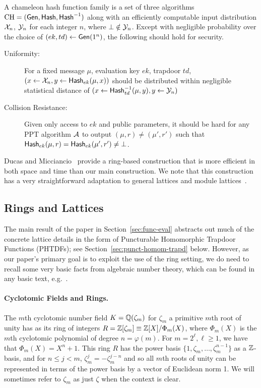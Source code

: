 \begin{definition}A chameleon hash function family is a set of three algorithms
  $\text{CH}=(\mathsf{Gen},\mathsf{Hash},\mathsf{Hash}^{-1})$ along with an efficiently computable
  input distribution $\mathcal{X}_n$, $\mathcal{Y}_n$ for each integer $n$, where
  $\bot \notin \mathcal{Y}_n$. Except with negligible probability over the
  choice of $(ek,td) \gets \mathsf{Gen}(1^n)$, the following should hold for
  security.
\begin{description}
\item[Uniformity:] For a fixed message $\mu$, evaluation key $ek$,
  trapdoor $td$, 
  $(x \gets \mathcal{X}_{n}, y \gets \mathsf{Hash}_{ek}(\mu,x))$ should be
  distributed within negligible statistical distance of $(x \gets
  \mathsf{Hash}^{-1}_{td}(\mu,y), y \gets \mathcal{Y}_{n})$
\item[Collision Resistance:] Given only access to $ek$ and public
  parameters, it should be hard for any PPT algorithm $\mathcal{A}$ to
  output $(\mu,r) \neq (\mu',r')$ such that
  $\mathsf{Hash}_{ek}(\mu,r)=\mathsf{Hash}_{ek}(\mu',r') \neq \bot$. 
\end{description}
\end{definition}


Ducas and
Micciancio~\cite{DBLP:conf/crypto/DucasM14} provide a
ring-based construction that is more efficient in both
space and time than our main construction.
We note that this construction
has a very straightforward adaptation to general lattices and module
lattices~\cite{DBLP:journals/dcc/LangloisS15}.

\subsection{Rings and Lattices}
\label{subsec:gaussians_lattices}

The main result of the paper in Section~\ref{sec:func-eval}
abstracts out much of the concrete lattice details in the form of Puncturable
Homomorphic Trapdoor Functions (PHTDFs); see
Section~\ref{sec:punct-homom-trapd} below. However, as our paper's
primary goal is to exploit the use of the ring setting, we do need to
recall some very basic facts from algebraic number theory, which can be
found in any basic text, e.g.~\cite{milneANT}. 

\paragraph{Cyclotomic Fields and Rings.} The $m$th cyclotomic number
field $K=\mathbb{Q}(\zeta_m)$ for $\zeta_m$ a primitive $m$th root of unity
has as its ring of integers $R=\mathbb{Z}[\zeta_m] \equiv \mathbb{Z}[X]/\Phi_{m}(X)$,
where $\Phi_{m}(X)$ is the $m$th cyclotomic polynomial of degree $n=\varphi(m)$. For
$m=2^{\ell}, \ell\geq 1$, we have that $\Phi_{m}(X) = X^{n}+1$. This
ring $R$ has the power basis $\{1,\zeta_m, \ldots, \zeta_{m}^{n-1}\}$ as a
$\mathbb{Z}$-basis, and for $n \leq j < m$, $\zeta_{m}^j = -\zeta_{m}^{j-n}$
and so all $m$th roots of unity can be represented in terms of the power basis by a vector
of Euclidean norm 1. We will sometimes refer to $\zeta_m$ as just
$\zeta$ when the context is clear.


